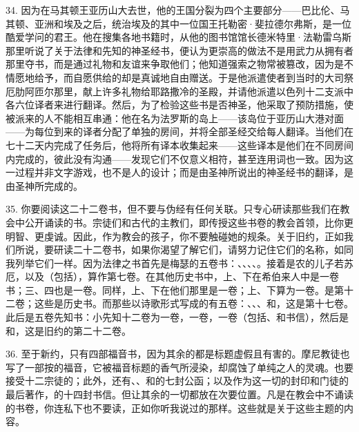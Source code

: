 34. 因为在马其顿王亚历山大去世，他的王国分裂为四个主要部分——巴比伦、马其顿、亚洲和埃及之后，统治埃及的其中一位国王托勒密·斐拉德尔弗斯，是一位酷爱学问的君王。他在搜集各地书籍时，从他的图书馆馆长德米特里·法勒雷乌斯那里听说了关于法律和先知的神圣经书，便认为更崇高的做法不是用武力从拥有者那里夺书，而是通过礼物和友谊来争取他们；他知道强索之物常被篡改，因为是不情愿地给予，而自愿供给的却是真诚地自由赠送。于是他派遣使者到当时的大司祭厄肋阿匝尔那里，献上许多礼物给耶路撒冷的圣殿，并请他派遣以色列十二支派中各六位译者来进行翻译。然后，为了检验这些书是否神圣，他采取了预防措施，使被派来的人不能相互串通：他在名为法罗斯的岛上——该岛位于亚历山大港对面——为每位到来的译者分配了单独的房间，并将全部圣经交给每人翻译。当他们在七十二天内完成了任务后，他将所有译本收集起来——这些译本是他们在不同房间内完成的，彼此没有沟通——发现它们不仅意义相符，甚至连用词也一致。因为这一过程并非文字游戏，也不是人的设计；而是由圣神所说出的神圣经书的翻译，是由圣神所完成的。\par

35. 你要阅读这二十二卷书，但不要与伪经有任何关联。只专心研读那些我们在教会中公开诵读的书。宗徒们和古代的主教们，即传授这些书卷的教会首领，比你更明智、更虔诚。因此，作为教会的孩子，你不要触碰她的规条。关于旧约，正如我们所说，要研读二十二卷书，如果你渴望了解它们，请努力记住它们的名称，如同我列举它们一样。因为法律之书首先是梅瑟的五卷书：、、、、。接着是农的儿子若苏厄，以及（包括），算作第七卷。在其他历史书中，上、下在希伯来人中是一卷书；三、四也是一卷。同样，上、下在他们那里是一卷；上、下算为一卷。是第十二卷；这些是历史书。而那些以诗歌形式写成的有五卷：、、、和，这是第十七卷。此后是五卷先知书：小先知十二卷为一卷，一卷，一卷（包括、和书信），然后是和，这是旧约的第二十二卷。\par

36. 至于新约，只有四部福音书，因为其余的都是标题虚假且有害的。摩尼教徒也写了一部按的福音，它被福音标题的香气所浸染，却腐蚀了单纯之人的灵魂。也要接受十二宗徒的；此外，还有、、和的七封公函；以及作为这一切的封印和门徒的最后著作，的十四封书信。但让其余的一切都放在次要位置。凡是在教会中不诵读的书卷，你连私下也不要读，正如你听我说过的那样。这些就是关于这些主题的内容。\par

